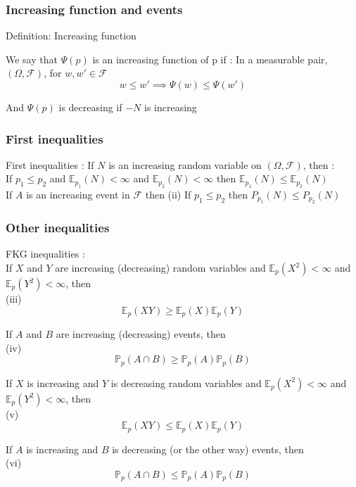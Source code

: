\documentclass{article}
\begin{document}
\subsubsection{Increasing function and events}
Definition: Increasing function

We say that $\Psi(p)$ is an increasing function of p if :
In a measurable pair, $(\Omega, \mathscr{F})$, for $w, w' \in \mathscr{F}$
$$w \leq w' \implies \Psi(w) \leq \Psi(w')$$

And $\Psi(p)$ is decreasing if $-N$ is increasing \\

\subsubsection{First inequalities}
First inequalities :
If $N$ is an increasing random variable on $(\Omega, \mathscr{F})$, then : \\
If $p_1 \leq p_2$ and $\mathbb{E}_{p_1}(N) < \infty$ and $\mathbb{E}_{p_2}(N) < \infty$ then $\mathbb{E}_{p_1}(N) \leq \mathbb{E}_{p_2}(N)$ \\

If $A$ is an increasing event in $\mathscr{F}$ then
(ii) If $p_1 \leq p_2$ then $P_{p_1}(N) \leq P_{p_2}(N)$ \\

\subsubsection{Other inequalities}

FKG inequalities : \\

If $X$ and $Y$ are increasing (decreasing) random variables and $\mathbb{E}_p{(X^2)} < \infty$ and $\mathbb{E}_p{(Y^2)} < \infty$, then \\
(iii)
$$\mathbb{E}_p(XY) \geq \mathbb{E}_p(X)\mathbb{E}_p(Y)$$

If $A$ and $B$ are increasing (decreasing) events, then \\
(iv)
$$\mathbb{P}_p(A \cap B) \geq \mathbb{P}_p(A)\mathbb{P}_p(B)$$

If  $X$ is increasing and $Y$ is decreasing random variables and $\mathbb{E}_p{(X^2)} < \infty$ and $\mathbb{E}_p{(Y^2)} < \infty$, then \\
(v)
$$\mathbb{E}_p(XY) \leq \mathbb{E}_p(X)\mathbb{E}_p(Y)$$

If $A$ is increasing and $B$ is decreasing (or the other way) events, then \\
(vi)
$$\mathbb{P}_p(A \cap B) \leq \mathbb{P}_p(A)\mathbb{P}_p(B)$$
\end{document}
